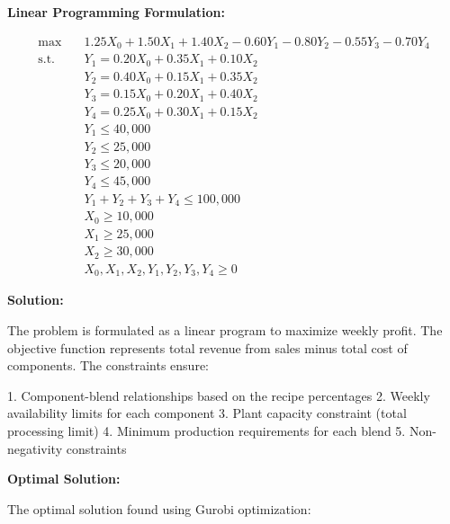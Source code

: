 \documentclass[11pt]{article}
\begin{document}
\begin{enumerate}
\textbf{Linear Programming Formulation:}

\begin{align*}
\max \quad & 1.25X_0 + 1.50X_1 + 1.40X_2 - 0.60Y_1 - 0.80Y_2 - 0.55Y_3 - 0.70Y_4 \\
\text{s.t.} \quad & Y_1 = 0.20X_0 + 0.35X_1 + 0.10X_2 \\
& Y_2 = 0.40X_0 + 0.15X_1 + 0.35X_2 \\
& Y_3 = 0.15X_0 + 0.20X_1 + 0.40X_2 \\
& Y_4 = 0.25X_0 + 0.30X_1 + 0.15X_2 \\
& Y_1 \leq 40,000 \\
& Y_2 \leq 25,000 \\
& Y_3 \leq 20,000 \\
& Y_4 \leq 45,000 \\
& Y_1 + Y_2 + Y_3 + Y_4 \leq 100,000 \\
& X_0 \geq 10,000 \\
& X_1 \geq 25,000 \\
& X_2 \geq 30,000 \\
& X_0, X_1, X_2, Y_1, Y_2, Y_3, Y_4 \geq 0
\end{align*}

\textbf{Solution:}

The problem is formulated as a linear program to maximize weekly profit. The objective function represents total revenue from sales minus total cost of components. The constraints ensure:

1. Component-blend relationships based on the recipe percentages
2. Weekly availability limits for each component
3. Plant capacity constraint (total processing limit)
4. Minimum production requirements for each blend
5. Non-negativity constraints

\textbf{Optimal Solution:}

The optimal solution found using Gurobi optimization:


\end{enumerate}
\end{document}
